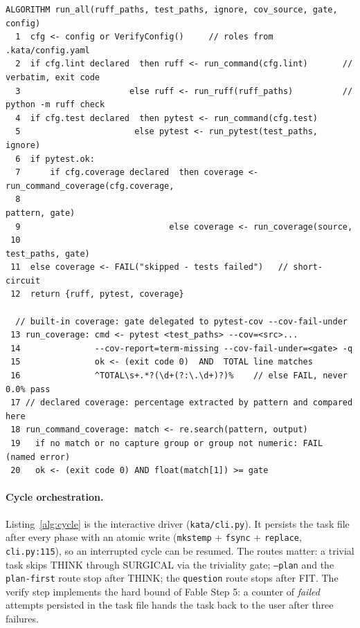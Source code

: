 \documentclass[11pt]{article}
\begin{document}
\begin{lstlisting}[caption=verification pipeline (kata/verify.py).,label=alg:verify]
ALGORITHM run_all(ruff_paths, test_paths, ignore, cov_source, gate, config)
  1  cfg <- config or VerifyConfig()     // roles from .kata/config.yaml
  2  if cfg.lint declared  then ruff <- run_command(cfg.lint)       // verbatim, exit code
  3                      else ruff <- run_ruff(ruff_paths)          // python -m ruff check
  4  if cfg.test declared  then pytest <- run_command(cfg.test)
  5                       else pytest <- run_pytest(test_paths, ignore)
  6  if pytest.ok:
  7      if cfg.coverage declared  then coverage <- run_command_coverage(cfg.coverage,
  8                                                                     pattern, gate)
  9                              else coverage <- run_coverage(source,
 10                                                             test_paths, gate)
 11  else coverage <- FAIL("skipped - tests failed")   // short-circuit
 12  return {ruff, pytest, coverage}

  // built-in coverage: gate delegated to pytest-cov --cov-fail-under
 13 run_coverage: cmd <- pytest <test_paths> --cov=<src>...
 14               --cov-report=term-missing --cov-fail-under=<gate> -q
 15               ok <- (exit code 0)  AND  TOTAL line matches
 16               ^TOTAL\s+.*?(\d+(?:\.\d+)?)%    // else FAIL, never 0.0% pass
 17 // declared coverage: percentage extracted by pattern and compared here
 18 run_command_coverage: match <- re.search(pattern, output)
 19   if no match or no capture group or group not numeric: FAIL (named error)
 20   ok <- (exit code 0) AND float(match[1]) >= gate
\end{lstlisting}

\paragraph{Cycle orchestration.} Listing~\ref{alg:cycle} is the interactive
driver (\texttt{kata/cli.py}). It persists the task file after every phase
with an atomic write (\texttt{mkstemp} + \texttt{fsync} + \texttt{replace},
\texttt{cli.py:115}), so an interrupted cycle can be resumed. The routes
matter: a trivial task skips THINK through SURGICAL via the triviality
gate; \texttt{--plan} and the \texttt{plan-first} route stop after THINK;
the \texttt{question} route stops after FIT. The verify step implements
the hard bound of Fable Step 5: a counter of \emph{failed} attempts
persisted in the task file hands the task back to the user after three
failures.
\end{document}
